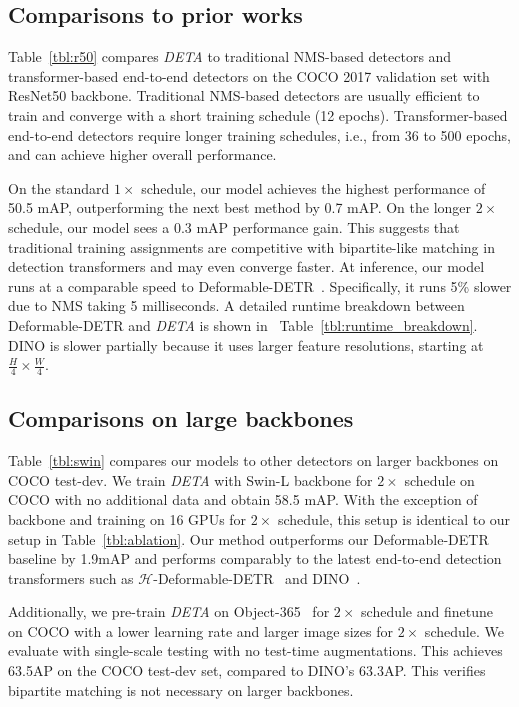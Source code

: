 \documentclass[10pt,twocolumn,letterpaper]{article}
\newcommand{\nmsdets}{{NMS-based detectors\xspace}}
\newcommand{\reftbl}[1]{Table~\ref{tbl:#1}}
\newcommand{\lblsec}[1]{\label{sec:#1}}
\def\name{{\textit{DETA}}\xspace}
\begin{document}
\subsection{Comparisons to prior works}
\lblsec{prior_works}


\reftbl{r50} compares \name to traditional \nmsdets{} and transformer-based end-to-end detectors on the COCO 2017 validation set with ResNet50 backbone.
Traditional \nmsdets{} are usually efficient to train and converge with a short training schedule (12 epochs).
Transformer-based end-to-end detectors require longer training schedules, i.e., from 36 to 500 epochs, and can achieve higher overall performance.

On the standard $1\times$ schedule, our model achieves the highest performance of 50.5 mAP, outperforming the next best method by 0.7 mAP.
On the longer $2\times$ schedule, our model sees a 0.3 mAP performance gain.
This suggests that traditional training assignments are competitive with bipartite-like matching in detection transformers and may even converge faster.
At inference, our model runs at a comparable speed to Deformable-DETR~\cite{zhu2020deformable}.
Specifically, it runs 5\% slower due to NMS taking 5 milliseconds.
A detailed runtime breakdown between Deformable-DETR and \name is shown in ~\reftbl{runtime_breakdown}.
DINO is slower partially because it uses larger feature resolutions, starting at $\frac{H}{4} \times \frac{W}{4}$.




\subsection{Comparisons on large backbones}
\lblsec{larger_backbones}
\reftbl{swin} compares our models to other detectors on larger backbones on COCO test-dev.
We train \name with Swin-L backbone for $2\times$ schedule on COCO with no additional data and obtain 58.5 mAP.
With the exception of backbone and training on 16 GPUs for $2\times$ schedule, this setup is identical to our setup in \reftbl{ablation}.
Our method outperforms our Deformable-DETR baseline by 1.9mAP and performs comparably to the latest end-to-end detection transformers such as $\mathcal{H}$-Deformable-DETR~\cite{jia2022detrs} and DINO~\cite{zhang2022dino}.

Additionally, we pre-train \name on Object-365~\cite{gao2019objects365} for $2\times$ schedule and finetune on COCO with a lower learning rate and larger image sizes for $2\times$ schedule.
We evaluate with single-scale testing with no test-time augmentations.
This achieves 63.5AP on the COCO test-dev set, compared to DINO's 63.3AP.
This verifies bipartite matching is not necessary on larger backbones.
\end{document}
